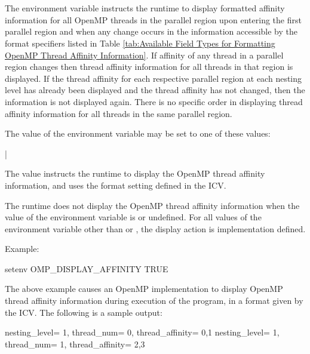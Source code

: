 \section{}
\label{sec:OMP_DISPLAY_AFFINITY}
The  environment variable instructs the runtime to
display formatted affinity information for all OpenMP threads in the parallel
region upon entering the first parallel region and when any change occurs in
the information accessible by the format specifiers listed in Table
\ref{tab:Available Field Types for Formatting OpenMP Thread Affinity Information}.
If affinity of any thread in a parallel region changes then thread
affinity information for all threads in that region is displayed.
If the thread affinity for each respective parallel region at each nesting level
has already been displayed and the thread affinity has not changed, then the
information is not displayed again. There is no specific order in displaying 
thread affinity information for all threads in the same parallel region.

The value of the  environment variable may be set 
to one of these values:

{|}

The  value instructs the runtime to display the OpenMP thread 
affinity information, and uses the format setting defined in the 
 ICV.

The runtime does not display the OpenMP thread affinity information when the 
value of the  environment variable is  
or undefined. For all values of the environment variable other than  
or , the display action is implementation defined.

Example:
\begin{ompEnv}
setenv OMP_DISPLAY_AFFINITY TRUE
\end{ompEnv}

The above example causes an OpenMP implementation to display OpenMP thread 
affinity information during execution of the program, in a format given by 
the  ICV.  The following is a sample output:

\begin{ompSyntax}
nesting_level=   1,   thread_num=   0,   thread_affinity=    0,1
nesting_level=   1,   thread_num=   1,   thread_affinity=    2,3
\end{ompSyntax}

